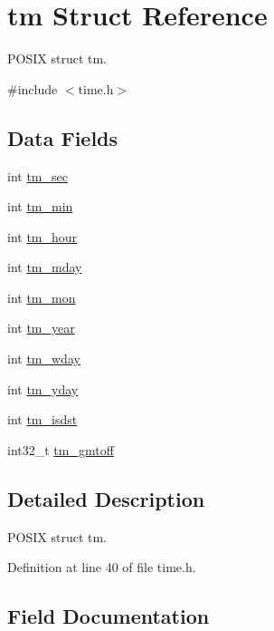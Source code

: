 \hypertarget{structtm}{}\section{tm Struct Reference}
\label{structtm}


P\+O\+S\+IX struct tm.  




{\ttfamily \#include $<$time.\+h$>$}

\subsection*{Data Fields}
\begin{DoxyCompactItemize}
\item 
int \hyperlink{structtm_a4d098a9a5c03a00b2ee61e10851de81e}{tm\+\_\+sec}
\item 
int \hyperlink{structtm_af414eb7c86cc3099595211eee4d4211b}{tm\+\_\+min}
\item 
int \hyperlink{structtm_a3e7ca4e37f1abcaf56b8a916c38eb9fe}{tm\+\_\+hour}
\item 
int \hyperlink{structtm_ab8d8904bad43b0c8b96e61941c5b5310}{tm\+\_\+mday}
\item 
int \hyperlink{structtm_a112ac36fa2f593777138a417cf031e17}{tm\+\_\+mon}
\item 
int \hyperlink{structtm_a33adf78fd6476b2120ce3b9c4a852053}{tm\+\_\+year}
\item 
int \hyperlink{structtm_afe81a8c46f1c693c43f259b288859f4f}{tm\+\_\+wday}
\item 
int \hyperlink{structtm_a93a0ba77cc23796df84405dcbcc57eb1}{tm\+\_\+yday}
\item 
int \hyperlink{structtm_a5645ca0580c8ab2c24f6c2965d9c9f9c}{tm\+\_\+isdst}
\item 
int32\+\_\+t \hyperlink{structtm_a6b7d1fb16f21197ea027e364e2812c3d}{tm\+\_\+gmtoff}
\end{DoxyCompactItemize}


\subsection{Detailed Description}
P\+O\+S\+IX struct tm. 

Definition at line 40 of file time.\+h.



\subsection{Field Documentation}
\mbox{\label{structtm_a6b7d1fb16f21197ea027e364e2812c3d}} 

